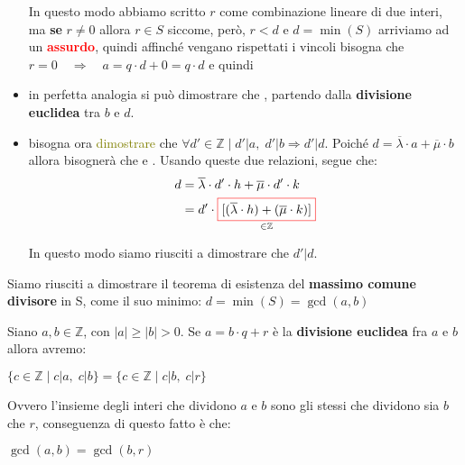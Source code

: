 \begin{boxA}
\begin{itemize}[nosep]
        In questo modo abbiamo scritto $r$ come combinazione lineare di due interi, ma \textbf{se} $r \neq 0$ allora $r \in S$ siccome, però, $r < d$ e $d = \min(S)$ arriviamo ad un \textcolor{red}{\textbf{assurdo}}, quindi affinché vengano rispettati i vincoli bisogna che $r = 0 \quad \Rightarrow \quad a = q \cdot d + 0 = q \cdot d$ e quindi 

        \item in perfetta analogia si può dimostrare che , partendo dalla \textbf{divisione euclidea} tra $b$ e $d$.
    \end{itemize}

    \begin{itemize}[nosep]
        \item bisogna ora \textcolor{olive}{dimostrare} che $\forall d' \in \mathbb{Z} \; | \; d'|a, \; d'|b \Rightarrow d'|d$. Poiché $d = \overline{\lambda} \cdot a + \overline{\mu} \cdot b$ allora bisognerà che  e . Usando queste due relazioni, segue che:
        \begin{align*}
            d &= \overline{\lambda} \cdot d' \cdot h + \overline{\mu} \cdot d' \cdot k \\
            &= d' \cdot \underset{\in \mathbb{Z}}{\fcolorbox{red}{white}{$[(\overline{\lambda} \cdot h) + (\overline{\mu} \cdot k)]$}}
        \end{align*}

        In questo modo siamo riusciti a dimostrare che $d'|d$.
    \end{itemize}
    Siamo riusciti a dimostrare il teorema di esistenza del \textbf{massimo comune divisore} in S, come il suo minimo: $d = \min(S) = \gcd(a, b)$
\end{boxA}

\begin{flushleft}
    Siano $a,b \in \mathbb{Z}$, con $|a| \geq |b| > 0$. Se $a = b \cdot q + r$ è la \textbf{divisione euclidea} fra $a$ e $b$ allora avremo:
    \begin{center}
        $\{c \in \mathbb{Z} \; \vert \; c | a, \; c | b \} = \{c \in \mathbb{Z} \; | \; c | b, \; c | r \}$
    \end{center}
    Ovvero l'insieme degli interi che dividono $a$ e $b$ sono gli stessi che dividono sia $b$ che $r$, conseguenza di questo fatto è che:
    \begin{center}
        $\gcd(a, b) = \gcd(b, r)$
    \end{center}
\end{flushleft}


